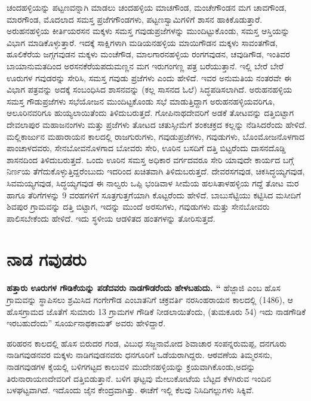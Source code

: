 ಚಂದಹಳ್ಳಿಯನ್ನು ಪಟ್ಟಣವನ್ನಾಗಿ ಮಾಡಲು ಚಂದಹಳ್ಳಿಯ ಮಾಚಗೌಂಡ, ಮಂಚೇಗೌಂಡನ ಮಗ ಚಾವಗೌಂಡ, ಮಾರಗೌಂಡ, ಮೊದಲಾದ ಸಮಸ್ತ ಪ್ರಜೆಗಗೌಂಡಗಳು, ಪಟ್ಟಣಸ್ವಾಮಿಗಳಿಗೆ ಶಾಸನ ಹಾಕಿಕೊಡುತ್ತಾರೆ. ಅರುಹನಹಳ್ಳಿಯ ಕೀರ್ತಿಯರಸನ ಮಕ್ಕಳು ಸಮಸ್ತ ಗವುಡುಪ್ರಜೆಗಳನ್ನು ಮುಂದಿಟ್ಟುಕೊಂಡು, ಸಮಸ್ತ ಆಸ್ತಿಯನ್ನು ವಿಭಾಗ ಮಾಡಿಕೊಳ್ಳುತ್ತಾರೆ. ಇದಕ್ಕೆ ಸಾಕ್ಷಿಗಳಾಗಿ ಮಡಿಯನಹಳ್ಳಿಯ ಮಾಯಿಗೌಡನ ಮಕ್ಕಳು ಸಾವಂತಗೌಡ, ಹೂಲಿಕೆರೆಯ ಜಗ್ಗಗವುಡನ ಮಕ್ಕಳು ಮಂಚೆಗೌಡ, ಮಾಲಗಾರನಹಳ್ಳಿಯ ರಂಗಗವುಡನ, ಚವುಡಿಗೌಡ, ಇಂತಿವರ ಬಾಯಾನುಮತದಿಂದ ಅರಸನಕೆರೆಯ\break ಪದುಮಣ್ಣನ ಮಗ ಇರುಗಂಗಣ್ಣ ಪತ್ರ ಬರೆಯುತ್ತಾನೆ. ಇಲ್ಲಿ ಬೇರೆ ಬೇರೆ ಊರುಗಳ ಗವುಡರನ್ನು ಸೇರಿಸಿ, ಸಮಸ್ತ ಗವುಡು ಪ್ರಜೆಗಳು ಎಂದು ಹೇಳಿದೆ. ಇವರ ಅನುಮತಿಯ ನಂತರವೇ ಈ ವಿಭಾಗ ಪತ್ರವನ್ನು ಅದಕ್ಕೆ ಸಂಬಂಧಿಸಿದ ಶಾಸನವನ್ನು (ಕಲ್ಲ ಸಾಸನದ ಓಲೆ) ಸಿದ್ಧಪಡಿಸಲಾಗಿದೆ. ಅರುಹನಹಳ್ಳಿಯ ಸಮಸ್ತ ಗೌಡುಪ್ರಜೆಗಳು ಸಭೆಯೋಜನ ಮುಂದಿಟ್ಟಕೊಂಡು ಸಭೆ ಮಾಡುತ್ತಿದ್ದಾಗ ಅರುಹನಹಳ್ಳಿಯವರಿಗೂ, ಆಲೂರಿನವರಿಗೂ ಹುಯ್ಯಲಾಯಿತೆಂದು ತಿಳಿದುಬರುತ್ತದೆ. ಗೋಪಿನಾಥ\-ದೇವರಿಗೆ ಅಡಕೆ ತೋಟವನ್ನು ದತ್ತಿಬಿಟ್ಟಾಗ ದೇವಲಾಪುರ ಮಹಾಜನಂಗಳು ಮತ್ತು ಪ್ರಜೆಗಳು ತೋಟದ ಚತುಸ್ಸೀಮೆಗೆ ಶಂಕಚಕ್ರದ ಕಲ್ಲನ್ನು ನೆಡಿಸಿದರೆಂದು ಹೇಳಿದೆ. ಮಲ್ಲಿಕಾರ್ಜುನ ಮಹಾರಾಯನ ಕಾಲದಲ್ಲಿ ರಾಜಗುರುಗಳು, ಗವುಡುಪ್ರಜೆಗಳು, ಗವುಡುಗಳು, ಬೊಂಮೋಜನೊಳಗಾದ ಪಾಂಚಾಳದವರು, ಸೇನಬೋವನೊಳಗಾದ ಬೋವರು ಸೇರಿ, ಊರಿನ ಬಸದಿಗೆ ದತ್ತಿ ಬಿಟ್ಟರೆಂದು ದಾಸನದೊಡ್ಡಿ ಶಾಸನದಿಂದ ತಿಳಿದುಬರುತ್ತದೆ. ಒಂದು ಊರಿನ ಸಮಸ್ತ ಅಧಿಕಾರ ವರ್ಗದವರೂ ಸೇರಿ ಯಾವುದೇ ಕಾರ್ಯದ ಬಗ್ಗೆ ನಿರ್ಣಯ ತೆಗೆದುಕೊಳ್ಳುತ್ತಿದ್ದರೆಂಬುದು ಇದರಿಂದ ಖಚಿತವಾಗಿ ತಿಳಿದು\-ಬರುತ್ತದೆ. ದೇವರಸಗವುಡ, ಚಿಕಸಿದ್ಧಯ್ಯಗವುಡ, ಸಿವಮಯ್ಯಗವುಡ, ಸಿದ್ಧಯ್ಯಗವುಡ ಈ ನಾಲ್ವರು ಒಪ್ಪಿ ಭಂಡಿವಾಳ ಸೀಮೆಯ ಹಲಸಿತಾಳಹಳ್ಳಿಯ ಗದ್ದೆ ತೋಟ ಮರ ಹಾಗೂ ತೆರಿಗೆಗಳನ್ನು 9 ವರಹಗಳಿಗೆ ಸೂತ್ರಗುತ್ತಗೆಯಾಗಿ ಕೊಟ್ಟರೆಂದು ಹೇಳಿದೆ. ಬಾಬುಸೆಟ್ಟಿಯು ಕಟ್ಟಿಸಿದ ಮಸೀದಿಗೆ ಶಿವಪುರ ಗ್ರಾಮವನ್ನು ದತ್ತಿ ಬಿಟ್ಟಾಗ, ಇದನ್ನು ಮುಂದೆ ಅರಸುಗಳು, ಗವುಡುಗಳು ಮತ್ತು ಸೇನಬೋವರು ಪಾಲಿಸಬೇಕೆಂದು ಹೇಳಿದೆ. ಇದು ಸ್ಥಳೀಯ ಆಡಳಿತದ ಹಂತಗಳನ್ನು ತೋರಿಸುತ್ತದೆ.


\section{ನಾಡ ಗವುಡರು}

\textbf{ಹತ್ತಾರು ಊರುಗಳ ಗೌಡಿಕೆಯನ್ನು ಪಡೆದವರು ನಾಡಗೌಡರೆಂದು ಹೇಳಬಹುದು. “} ಹೆಜ್ಜಾಜಿ ಎಂಬ ಹೊಸ ಗ್ರಾಮವನ್ನು ಸ್ಥಾಪಿಸಲು ಶ್ರಮಿಸಿದ ಗಂಗೇಗೌಡ ಎಂಬಾತನಿಗೆ ಚಕ್ರವರ್ತಿ ನರಸಿಂಹರಾಯನ ಕಾಲದಲ್ಲಿ (1486), ಆ ಹೊಸಗ್ರಾಮದ ಜೊತೆಗೆ ಸುಮಾರು 13 ಗ್ರಾಮಗಳ ಗೌಡಿಕೆ ನೀಡಲಾಯಿತೆಂದು, (ತುಮಕೂರು 54) ಇದು ನಾಡಗೌಡಿಕೆ ಇರಬಹುದೆಂದು” ಸೂರ್ಯನಾಥಕಾಮತ್​ ಅವರು ಹೇಳಿದ್ದಾರೆ.

ಹರಿಹರನ ಕಾಲದಲ್ಲಿ ಹೊಸ ಬಿರುದರ ಗಂಡ, ವಿಬುಧ ಸಜ್ಜನಾಮೋದ ಶಿವಾಚಾರ ಸಂಪನ್ನರುಮಪ್ಪ, ದನಗೂರು ನಾಡಿಗವುಡ\-ನವರ ಮಕ್ಕಳು ನಾಡಿಗವುಡನವರು ಧನಗೂರಿಗೆ ಒಡೆಯರಾಗಿದ್ದರು. ಆಠವಣೆಯ ತಿಮ್ಮರಸನು, ನಾಡಗವುಡಗಳ ಕೈಯಲ್ಲಿ ಬಳಿಗಗಟ್ಟದ ಕಾಲುವಳಿ ಮುದೇನಹಳ್ಳಿಯನ್ನು ಕ್ರಯವಾಗಿಕೊಂಡು,ಅದನ್ನು ತಿರುನಾರಾಯಣದೇವರಿಗೆ ದತ್ತಿ\break ಬಿಡುತ್ತಾನೆ. ಬಳಿಗ ಘಟ್ಟವು ಮೇಲುಕೋಟೆಯ ಬೆಟ್ಟದ ಕೆಳಗಿರುವ ಇಂದಿನ ಬಳಘಟ್ಟವಾಗಿದೆ. ಇದೊಂದು ಜೈನ ಕೇಂದ್ರವಾಗಿತ್ತು. ಈಚೆಗೆ ಇಲ್ಲಿ ಕೆಲವು ನಿಸಿದಿಗಲ್ಲುಗಳು ಸಿಕ್ಕಿವೆ.


